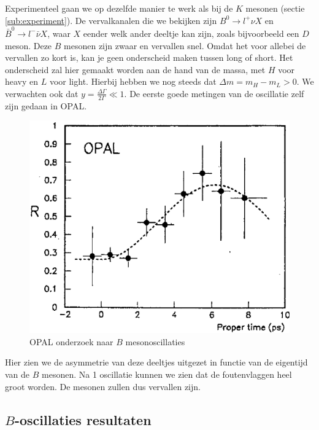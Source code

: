 \documentclass[../main.tex]{subfiles}
\begin{document}
Experimenteel gaan we op dezelfde manier te werk als bij de $K$ mesonen (sectie \ref{sub:experiment}). De vervalkanalen die we bekijken zijn $B^{0} \rightarrow l^{+} \nu X$ en $\bar{B}^{0} \rightarrow l^{-} \bar{\nu} X$, waar $X$ eender welk ander deeltje kan zijn, zoals bijvoorbeeld een $D$ meson. Deze $B$ mesonen zijn zwaar en vervallen snel. Omdat het voor allebei de vervallen zo kort is, kan je geen onderscheid maken tussen long of short. Het onderscheid zal hier gemaakt worden aan de hand van de massa, met $H$ voor heavy en $L$ voor light. Hierbij hebben we nog steeds dat $\Delta m = m_H - m_L > 0$. We verwachten ook dat $y = \frac{\Delta \Gamma}{2 \Gamma} \ll 1$. De eerste goede metingen van de oscillatie zelf zijn gedaan in OPAL.

\begin{figure}[h]
    \centering
    \includegraphics[width=0.6\linewidth]{meson_mixing_and_oscillations/b_osc_exp.png}
    \caption{OPAL onderzoek naar $B$ mesonoscillaties}%
    \label{fig:meson_mixing_and_oscillations/b_osc_exp}
\end{figure}

Hier zien we de asymmetrie van deze deeltjes uitgezet in functie van de eigentijd van de $B$ mesonen. Na 1 oscillatie kunnen we zien dat de foutenvlaggen heel groot worden. De mesonen zullen dus vervallen zijn.

\subsection{$B$-oscillaties resultaten}%
\label{sub:_b_oscillaties_resultaten}
\end{document}
